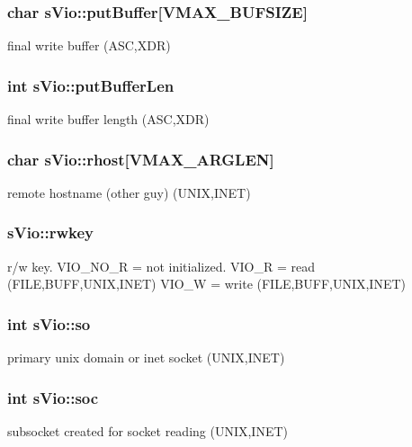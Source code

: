 \subsubsection[{put\-Buffer}]{\setlength{\rightskip}{0pt plus 5cm}char s\-Vio\-::put\-Buffer[{\bf V\-M\-A\-X\-\_\-\-B\-U\-F\-S\-I\-Z\-E}]}\label{a00002_a026eee4ab9d1413ac7dec57bcba4cff9}
final write buffer (A\-S\-C,X\-D\-R) 
\subsubsection[{put\-Buffer\-Len}]{\setlength{\rightskip}{0pt plus 5cm}int s\-Vio\-::put\-Buffer\-Len}\label{a00002_ad68b54648906734b80b93205cfb22812}
final write buffer length (A\-S\-C,X\-D\-R) 
\subsubsection[{rhost}]{\setlength{\rightskip}{0pt plus 5cm}char s\-Vio\-::rhost[{\bf V\-M\-A\-X\-\_\-\-A\-R\-G\-L\-E\-N}]}\label{a00002_af3eaf81b391a451956735215da0f6b55}
remote hostname (other guy) (U\-N\-I\-X,I\-N\-E\-T) 
\subsubsection[{rwkey}]{ s\-Vio\-::rwkey}\label{a00002_a46b6d2de5b885ef6850e74dbf69230c5}
r/w key. V\-I\-O\-\_\-\-N\-O\-\_\-\-R = not initialized. V\-I\-O\-\_\-\-R = read (F\-I\-L\-E,B\-U\-F\-F,U\-N\-I\-X,I\-N\-E\-T) V\-I\-O\-\_\-\-W = write (F\-I\-L\-E,B\-U\-F\-F,U\-N\-I\-X,I\-N\-E\-T) 
\subsubsection[{so}]{\setlength{\rightskip}{0pt plus 5cm}int s\-Vio\-::so}\label{a00002_af100e7b153d174650215657e74e0360f}
primary unix domain or inet socket (U\-N\-I\-X,I\-N\-E\-T) 
\subsubsection[{soc}]{\setlength{\rightskip}{0pt plus 5cm}int s\-Vio\-::soc}\label{a00002_a846bff280f1fad2f64708f80dd824d72}
subsocket created for socket reading (U\-N\-I\-X,I\-N\-E\-T) 

